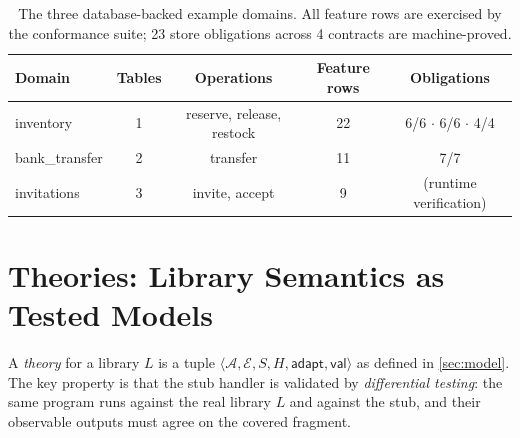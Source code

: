 \documentclass[11pt,a4paper]{article}
\begin{document}
\begin{table}[t]
\centering\small
\begin{tabular}{@{}lcccc@{}}
\toprule
Domain & Tables & Operations & Feature rows & Obligations \\
\midrule
inventory & 1 & reserve, release, restock & 22 & 6/6 $\cdot$ 6/6 $\cdot$ 4/4 \\
bank\_transfer & 2 & transfer & 11 & 7/7 \\
invitations & 3 & invite, accept & 9 & (runtime verification) \\
\bottomrule
\end{tabular}
\caption{The three database-backed example domains.  All feature rows
are exercised by the conformance suite; 23 store obligations across 4
contracts are machine-proved.}
\label{tab:domains}
\end{table}

\section{Theories: Library Semantics as Tested Models}\label{sec:theories}

A \emph{theory} for a library $L$ is a tuple
$\langle \mathcal{A}, \mathcal{E}, S, H, \mathsf{adapt},
\mathsf{val} \rangle$ as defined in \cref{sec:model}.  The key
property is that the stub handler is validated by
\emph{differential testing}: the same program runs against the real
library $L$ and against the stub, and their observable outputs must
agree on the covered fragment.
\end{document}
